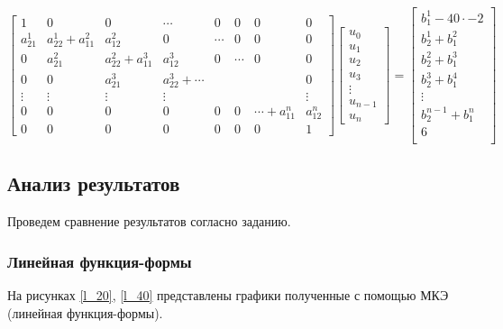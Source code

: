 $$
\begin{bmatrix}
1     &   0        &   0 & \cdots & 0 & 0 & 0  & 0\\
a_{21}^1     &    a_{22}^1+a_{11}^2 & a_{12}^2  & 0 & \cdots & 0 & 0  & 0\\
0     &    a_{21}^2 & a_{22}^2+a_{11}^3  &  a_{12}^3  & 0 & \cdots & 0  & 0\\
0     &    0  & a_{21}^3  & a_{22}^3+ \cdots  &  & &   & 0\\
\vdots & \vdots & \vdots & \vdots &  &  &   & \vdots\\
0 & 0 & 0 & 0 &  0 & 0 & \cdots+a_{11}^n  & a_{12}^n\\
0 & 0 & 0 & 0 &  0 & 0 & 0 & 1
\end{bmatrix}
\begin{bmatrix}
u_0 \\
u_1 \\
u_2\\
u_3\\
\vdots\\
u_{n-1}\\
u_n
\end{bmatrix} =
\begin{bmatrix}
 b_1^1   -40  \cdot -2   \\
b_2^1+b_1^2\\
b_2^2+b_1^3\\
b_2^3+b_1^4\\
\vdots\\
b_2^{n-1}+b_1^n\\
 6   \\
\end{bmatrix}
$$

\subsection{Анализ результатов}

Проведем сравнение результатов согласно заданию.

\subsubsection{Линейная функция-формы}


На рисунках \ref{l_20}, \ref{l_40} представлены графики полученные с помощью МКЭ (линейная функция-формы).

